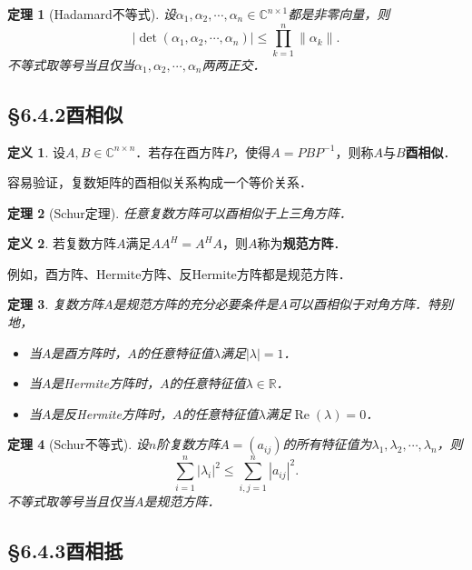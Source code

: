 \documentclass[a4paper,fontset=windows]{ctexbook}
\newtheorem{theorem}{定理}[chapter]
\theoremstyle{definition}
\newtheorem{definition}{定义}[chapter]
\DeclareMathOperator{\re}{Re}
\renewcommand{\le}{\leqslant}
\begin{document}
\begin{theorem}[Hadamard不等式]
设$\alpha_1,\alpha_2,\cdots,\alpha_n\in\mathbb{C}^{n\times 1}$都是非零向量，则
$$|\det(\alpha_1,\alpha_2,\cdots,\alpha_n)|\le\prod\limits_{k=1}^n\|\alpha_k\|.$$
不等式取等号当且仅当$\alpha_1,\alpha_2,\cdots,\alpha_n$两两正交．
\end{theorem}

\subsection*{\S 6.4.2\quad 酉相似}

\begin{definition}
设$A,B\in\mathbb{C}^{n\times n}$．若存在酉方阵$P$，使得$A=PBP^{-1}$，则称$A$与$B${\bf 酉相似}．
\end{definition}

容易验证，复数矩阵的酉相似关系构成一个等价关系．

\begin{theorem}[Schur定理]
任意复数方阵可以酉相似于上三角方阵．
\end{theorem}

\begin{definition}
若复数方阵$A$满足$AA^H=A^HA$，则$A$称为{\bf 规范方阵}．
\end{definition}

例如，酉方阵、Hermite方阵、反Hermite方阵都是规范方阵．

\begin{theorem}\label{thm6.15}
复数方阵$A$是规范方阵的充分必要条件是$A$可以酉相似于对角方阵．特别地，
\begin{itemize}
\item 当$A$是酉方阵时，$A$的任意特征值$\lambda$满足$|\lambda|=1$．
\item 当$A$是Hermite方阵时，$A$的任意特征值$\lambda\in\mathbb{R}$．
\item 当$A$是反Hermite方阵时，$A$的任意特征值$\lambda$满足$\re(\lambda)=0$．
\end{itemize}
\end{theorem}

\begin{theorem}[Schur不等式]
设$n$阶复数方阵$A=(a_{ij})$的所有特征值为$\lambda_1,\lambda_2,\cdots,\lambda_n$，则
$$\sum\limits_{i=1}^n|\lambda_i|^2\le\sum\limits_{i,j=1}^n|a_{ij}|^2.$$
不等式取等号当且仅当$A$是规范方阵．
\end{theorem}

\subsection*{\S 6.4.3\quad 酉相抵}
\end{document}
